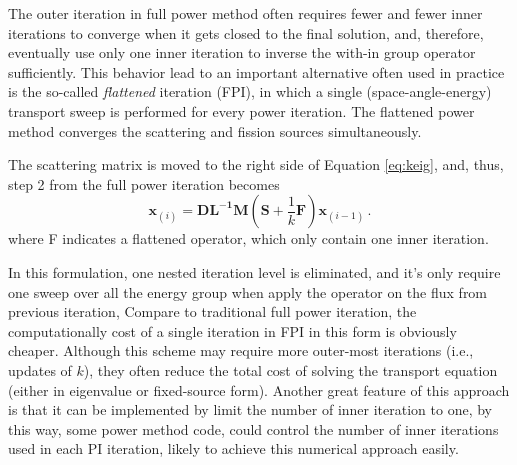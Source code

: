 The outer iteration in full power method often requires fewer and fewer inner iterations to converge when it gets closed to the final solution, and, therefore, eventually use only one inner iteration to inverse the with-in group operator sufficiently.  
This behavior lead to an important alternative often used in practice is the so-called {\it flattened} iteration (FPI), in which a single (space-angle-energy) transport sweep is performed for every power iteration.
The flattened power method converges the scattering and fission sources simultaneously.

The scattering matrix is moved to the right side of Equation \ref{eq:keig}, and, thus, step 2 from the full power iteration becomes 
\begin{equation}
 \mathbf{x}_{(i)} =  \mathbf{DL^{-1}M} (\mathbf{S} + \frac{1}{k} \mathbf{F})\mathbf{x}_{(i-1)}   \, .
 \label{eq:flatten}
\end{equation}
where F indicates a flattened operator, which only contain one inner iteration.

In this formulation, one nested iteration level is eliminated, and it's only require one sweep over all the energy group when apply the operator on the flux from previous iteration,  
Compare to traditional full power iteration, the computationally cost of a single iteration in FPI in this form is obviously cheaper.
Although this scheme may require more outer-most iterations (i.e., updates of $k$), they often reduce the total cost of solving the transport equation (either in eigenvalue  or fixed-source form).\citep{gill_newtons_2011}
Another great feature of this approach is that it can be implemented by limit the number of inner iteration to one, by this way, some power method code, could control the number of inner iterations used in each PI iteration, likely to achieve this numerical approach easily.  



